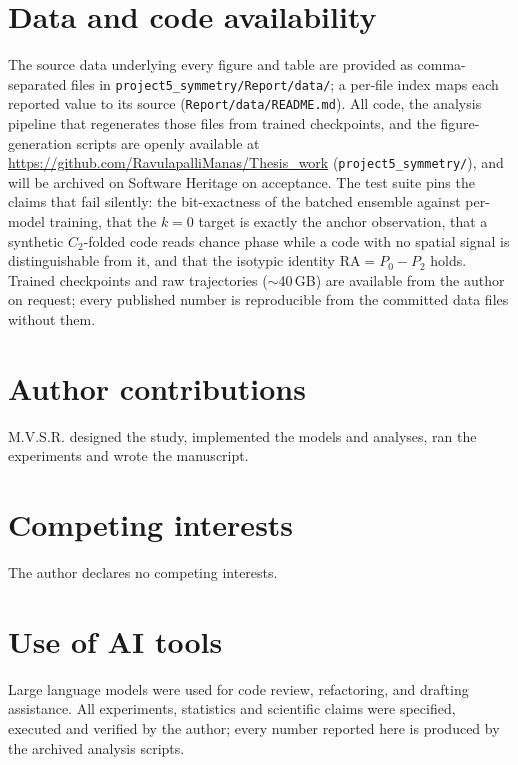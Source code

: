 \documentclass[9pt,lineno]{elife}
\begin{document}
\section*{Data and code availability}

The source data underlying every figure and table are provided as comma-separated files in
\texttt{project5\_symmetry/Report/data/}; a per-file index maps each reported value to its
source (\texttt{Report/data/README.md}). All code, the analysis pipeline that regenerates those
files from trained checkpoints, and the figure-generation scripts are openly available at
\url{https://github.com/RavulapalliManas/Thesis_work} (\texttt{project5\_symmetry/}), and will
be archived on Software Heritage on acceptance. The test suite pins the claims that fail
silently: the bit-exactness of the batched ensemble against per-model training, that the $k=0$
target is exactly the anchor observation, that a synthetic $C_2$-folded code reads chance phase
while a code with no spatial signal is distinguishable from it, and that the isotypic identity
$\mathrm{RA} = P_0 - P_2$ holds. Trained checkpoints and raw trajectories ($\sim$40\,GB) are
available from the author on request; every published number is reproducible from the committed
data files without them.

\section*{Author contributions}
M.V.S.R. designed the study, implemented the models and analyses, ran the experiments and wrote
the manuscript.

\section*{Competing interests}
The author declares no competing interests.

\section*{Use of AI tools}
Large language models were used for code review, refactoring, and drafting assistance. All
experiments, statistics and scientific claims were specified, executed and verified by the
author; every number reported here is produced by the archived analysis scripts.


\end{document}
